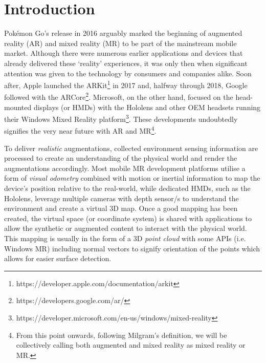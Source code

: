 
\section{Introduction}
Pok\'emon Go's release in 2016 arguably marked the beginning of augmented reality (AR) and mixed reality (MR) to be part of the mainstream mobile market. Although there were numerous earlier applications and devices that already delivered these `reality' experiences, it was only then when significant attention was given to the technology by consumers and companies alike. Soon after, Apple launched the ARKit\footnote{https://developer.apple.com/documentation/arkit} in 2017 and, halfway through 2018, Google followed with the ARCore\footnote{https://developers.google.com/ar/}. Microsoft, on the other hand, focused on the head-mounted displays (or HMDs) with the Hololens and other OEM headsets running their Windows Mixed Reality platform\footnote{https://developer.microsoft.com/en-us/windows/mixed-reality}. These developments undoubtedly signifies the very near future with AR and MR\footnote{From this point onwards, following Milgram's definition\cite{milgram1994taxonomy}, we will be collectively calling both augmented and mixed reality as mixed reality or MR.}.

To deliver \textit{realistic} augmentations, collected environment sensing information are processed to create an understanding of the physical world and render the augmentations accordingly. Most mobile MR development platforms utilise a form of \textit{visual odometry} \cite{yousif2015overview} combined with motion or inertial information to map the device's position relative to the real-world, while dedicated HMDs, such as the Hololens, leverage multiple cameras with depth sensor/s to understand the environment and create a virtual 3D map. Once a good mapping has been created, the virtual space (or coordinate system) is shared with applications to allow the synthetic or augmented content to interact with the physical world. This mapping is usually in the form of a 3D \textit{point cloud} with some APIs (i.e. Windows MR) including normal vectors to signify orientation of the points which allows for easier surface detection. %

